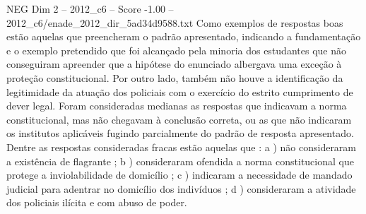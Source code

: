 \begin{textsample}{NEG Dim 2 – 2012\_c6 – Score -1.00 – 2012\_c6/enade\_2012\_dir\_5ad34d9588.txt}
Como exemplos de respostas boas estão aquelas que preencheram o padrão apresentado, indicando a fundamentação e o exemplo pretendido que foi alcançado pela minoria dos estudantes que não conseguiram apreender que a hipótese do enunciado albergava uma exceção à proteção constitucional.
Por outro lado, também não houve a identificação da legitimidade da atuação dos policiais com o exercício do estrito cumprimento de dever legal.
Foram consideradas medianas as respostas que indicavam a norma constitucional, mas não chegavam à conclusão correta, ou as que não indicaram os institutos aplicáveis fugindo parcialmente do padrão de resposta apresentado.
Dentre as respostas consideradas fracas estão aquelas que : a ) não consideraram a existência de flagrante ; b ) consideraram ofendida a norma constitucional que protege a inviolabilidade de domicílio ; c ) indicaram a necessidade de mandado judicial para adentrar no domicílio dos indivíduos ; d ) consideraram a atividade dos policiais ilícita e com abuso de poder.

\end{textsample}
